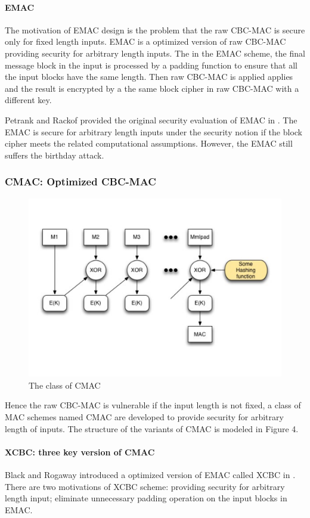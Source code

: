 \documentclass{article}
\begin{document}
\paragraph{EMAC}
The motivation of EMAC design is the problem that the raw CBC-MAC is secure only for fixed length inputs. 
EMAC is a optimized version of raw CBC-MAC providing security for arbitrary length inputs. The in the EMAC scheme, the final message block in the input is processed by a padding function to ensure that all the input blocks have the same length. Then raw CBC-MAC is applied applies and the result is encrypted by a the same block cipher in raw CBC-MAC with a different key. 

Petrank and Rackof provided the original security evaluation of EMAC in \cite{emac}. The EMAC is secure for arbitrary length inputs under the security notion if the block cipher meets the related computational assumptions. However, the EMAC still suffers the birthday attack.
\subsubsection{CMAC: Optimized CBC-MAC}
\begin{figure}[htbp]
\centering
\includegraphics[scale=0.3]{./diagram/cmac.pdf}
\caption{The class of CMAC}
\label{fig:4 }
\end{figure}
Hence the raw CBC-MAC is vulnerable if the input length is not fixed, a class of MAC schemes named CMAC are developed to provide security for arbitrary length of inputs. The structure of the  variants of CMAC is modeled in Figure 4.
\paragraph{XCBC: three key version of CMAC }
Black and Rogaway introduced a optimized version of EMAC called XCBC in \cite{xcbc}.
There are two motivations of XCBC scheme: providing security for arbitrary length input; eliminate unnecessary padding operation on the input blocks in EMAC.
\end{document}
